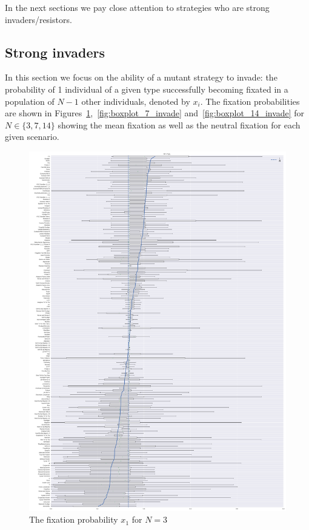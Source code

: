 \documentclass{article}
\begin{document}
In the next sections we pay close attention to
strategies who are strong invaders/resistors.

\subsection{Strong invaders}\label{sec:strong_invaders}

In this section we focus on the ability of a mutant strategy to invade: the
probability of 1 individual of a given type successfully becoming fixated in a
population of \(N - 1\) other individuals, denoted by \(x_i\). The fixation
probabilities are shown in
Figures~\ref{fig:boxplot_3_invade},~\ref{fig:boxplot_7_invade}
and~\ref{fig:boxplot_14_invade} for \(N\in\{3, 7, 14\}\) showing the mean
fixation as well as the neutral fixation for each given scenario.

\begin{figure}[!hbtp]
    \centering
    \includegraphics[height=.8\textheight]{./img/boxplot_3_invade.pdf}
    \caption{The fixation probability \(x_1\) for \(N=3\)}
    \label{fig:boxplot_3_invade}
\end{figure}
\end{document}
